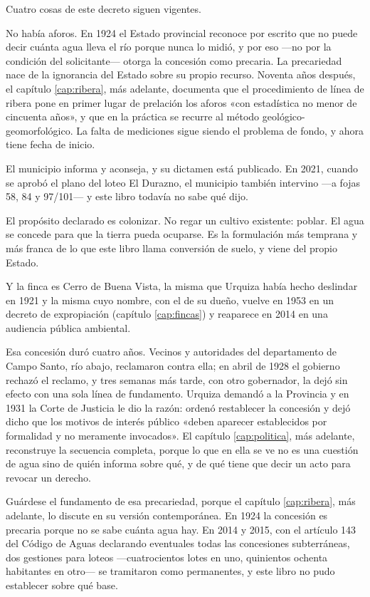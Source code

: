 Cuatro cosas de este decreto siguen vigentes.

No había aforos. En 1924 el Estado provincial reconoce por escrito que no puede decir
cuánta agua lleva el río porque nunca lo midió, y por eso —no por la condición del
solicitante— otorga la concesión como precaria. La precariedad nace de la ignorancia del
Estado sobre su propio recurso. Noventa años después, el capítulo \ref{cap:ribera}, más adelante, documenta que el
procedimiento de línea de ribera pone en primer lugar de prelación los aforos «con
estadística no menor de cincuenta años», y que en la práctica se recurre al método
geológico-geomorfológico. La falta de mediciones sigue siendo el problema de fondo, y ahora
tiene fecha de inicio.

El municipio informa y aconseja, y su dictamen está publicado. En 2021, cuando se aprobó el
plano del loteo El Durazno, el municipio también intervino —a fojas 58, 84 y 97/101— y este
libro todavía no sabe qué dijo.

El propósito declarado es colonizar. No regar un cultivo existente: poblar. El agua se
concede para que la tierra pueda ocuparse. Es la formulación más temprana y más franca de
lo que este libro llama conversión de suelo, y viene del propio Estado.

Y la finca es Cerro de Buena Vista, la misma que Urquiza había hecho deslindar en 1921 y la
misma cuyo nombre, con el de su dueño, vuelve en 1953 en un decreto de expropiación (capítulo \ref{cap:fincas}) y reaparece en 2014 en una audiencia pública ambiental.

Esa concesión duró cuatro años. Vecinos y autoridades del departamento de Campo Santo, río
abajo, reclamaron contra ella; en abril de 1928 el gobierno rechazó el reclamo, y tres
semanas más tarde, con otro gobernador, la dejó sin efecto con una sola línea de
fundamento. Urquiza demandó a la Provincia y en 1931 la Corte de Justicia le dio la razón: ordenó
restablecer la concesión y dejó dicho que los motivos de interés público «deben aparecer
establecidos por formalidad y no meramente invocados». El capítulo \ref{cap:politica}, más adelante, reconstruye la
secuencia completa, porque lo que en ella se ve no es una cuestión de agua sino de quién
informa sobre qué, y de qué tiene que decir un acto para revocar un derecho.

\begin{cautela}
Guárdese el fundamento de esa precariedad, porque el capítulo \ref{cap:ribera}, más adelante, lo discute en su versión
contemporánea. En 1924 la concesión es precaria porque no se sabe cuánta agua hay. En 2014
y 2015, con el artículo 143 del Código de Aguas declarando eventuales todas las concesiones
subterráneas, dos gestiones para loteos —cuatrocientos lotes en uno, quinientos ochenta
habitantes en otro— se tramitaron como permanentes, y este libro no pudo establecer sobre
qué base.
\end{cautela}

